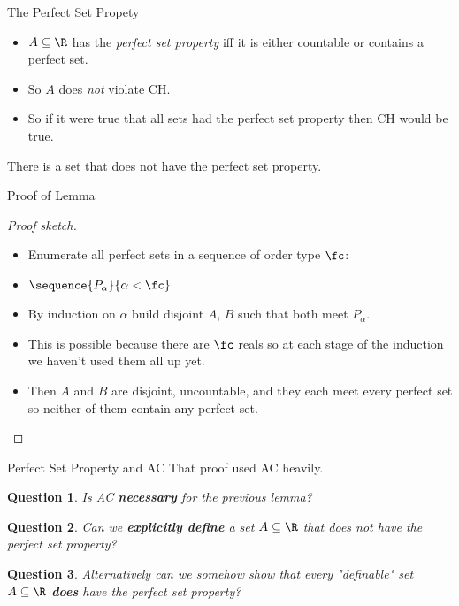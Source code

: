 \documentclass{beamer}
\newtheorem*{question}{Question}
\begin{document}
\begin{frame}{The Perfect Set Propety}

\begin{definition}
\begin{itemize}
  \item $A\subseteq\R$ has the \emph{perfect set property} iff it is either
  countable or contains a perfect set.
  \item So $A$ does \emph{not} violate CH.
  \item So if it were true that all sets had the perfect set property then CH
        would be true.
\end{itemize}
\end{definition}

\begin{lemma}
There is a set that does not have the perfect set property.
\end{lemma}

\end{frame}

\begin{frame}{Proof of Lemma}

\begin{proof}[Proof sketch]
\begin{itemize}
  \item Enumerate all perfect sets in a sequence of order type $\fc$:
  \item $\sequence{P_{\alpha}}{\alpha < \fc}$
  \item By induction on $\alpha$ build disjoint $A$, $B$ such that both meet $P_{\alpha}$.
  \item This is possible because there are $\fc$ reals so at
         each stage of the induction we haven't used them all up yet.
  \item Then $A$ and $B$ are disjoint, uncountable, and they each meet every
        perfect set so neither of them contain any perfect set.
\end{itemize}
\end{proof}
\end{frame}

\begin{frame}{Perfect Set Property and AC}
That proof used AC heavily.

\begin{question}
Is AC \textbf{necessary} for the previous lemma?
\end{question}

\begin{question}
Can we \textbf{explicitly define} a set $A\subseteq \R$ that does not have the perfect set property?
\end{question}

\begin{question}
 Alternatively can we somehow show that every "definable" set
$A\subseteq \R$ \textbf{does} have the perfect set property?
\end{question}

\end{frame}
\end{document}
